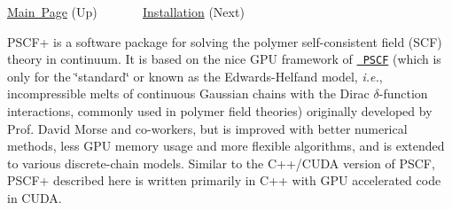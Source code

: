 \mbox{\hyperlink{index}{Main Page}} (Up) ~ ~ ~ ~ \mbox{\hyperlink{install_page}{Installation}} (Next) ~\newline
 ~\newline


P\+S\+C\+F+ is a software package for solving the polymer self-\/consistent field (S\+CF) theory in continuum. It is based on the nice G\+PU framework of \href{https://github.com/dmorse/pscfpp}{\texttt{ P\+S\+CF}} (which is only for the \char`\"{}standard\char`\"{} or known as the Edwards-\/\+Helfand model, {\itshape i.\+e.}, incompressible melts of continuous Gaussian chains with the Dirac {\itshape {$\delta$}}-\/function interactions, commonly used in polymer field theories) originally developed by Prof. David Morse and co-\/workers, but is improved with better numerical methods, less G\+PU memory usage and more flexible algorithms, and is extended to various discrete-\/chain models. Similar to the C++/\+C\+U\+DA version of P\+S\+CF, P\+S\+C\+F+ described here is written primarily in C++ with G\+PU accelerated code in C\+U\+DA.

